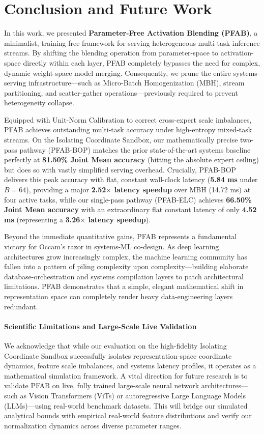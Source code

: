 \section{Conclusion and Future Work}
\label{sec:conclusion}

In this work, we presented \textbf{Parameter-Free Activation Blending (PFAB)}, a minimalist, training-free framework for serving heterogeneous multi-task inference streams. By shifting the blending operation from parameter-space to activation-space directly within each layer, \textsc{PFAB} completely bypasses the need for complex, dynamic weight-space model merging. Consequently, we prune the entire systems-serving infrastructure—such as Micro-Batch Homogenization (MBH), stream partitioning, and scatter-gather operations—previously required to prevent heterogeneity collapse.

Equipped with Unit-Norm Calibration to correct cross-expert scale imbalances, \textsc{PFAB} achieves outstanding multi-task accuracy under high-entropy mixed-task streams. On the Isolating Coordinate Sandbox, our mathematically precise two-pass pathway (\textsc{PFAB-BOP}) matches the prior state-of-the-art systems baseline perfectly at \textbf{81.50\% Joint Mean accuracy} (hitting the absolute expert ceiling) but does so with vastly simplified serving overhead. Crucially, \textsc{PFAB-BOP} delivers this peak accuracy with flat, constant wall-clock latency (\textbf{5.84 ms} under $B=64$), providing a major \textbf{2.52$\times$ latency speedup} over MBH (14.72 ms) at four active tasks, while our single-pass pathway (\textsc{PFAB-ELC}) achieves \textbf{66.50\% Joint Mean accuracy} with an extraordinary flat constant latency of only \textbf{4.52 ms} (representing a \textbf{3.26$\times$ latency speedup}).

Beyond the immediate quantitative gains, \textsc{PFAB} represents a fundamental victory for Occam's razor in systems-ML co-design. As deep learning architectures grow increasingly complex, the machine learning community has fallen into a pattern of piling complexity upon complexity—building elaborate database-orchestration and systems compilation layers to patch architectural limitations. \textsc{PFAB} demonstrates that a simple, elegant mathematical shift in representation space can completely render heavy data-engineering layers redundant.

\paragraph{Scientific Limitations and Large-Scale Live Validation}
We acknowledge that while our evaluation on the high-fidelity Isolating Coordinate Sandbox successfully isolates representation-space coordinate dynamics, feature scale imbalances, and systems latency profiles, it operates as a mathematical simulation framework. A vital direction for future research is to validate \textsc{PFAB} on live, fully trained large-scale neural network architectures—such as Vision Transformers (ViTs) or autoregressive Large Language Models (LLMs)—using real-world benchmark datasets. This will bridge our simulated analytical bounds with empirical real-world feature distributions and verify our normalization dynamics across diverse parameter ranges.

